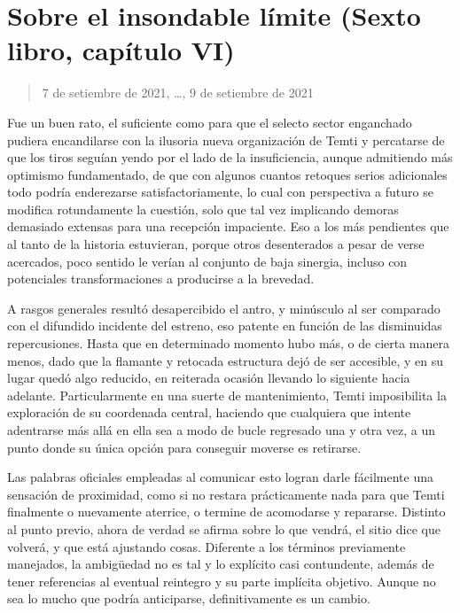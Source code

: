 \documentclass[
]{book}
\begin{document}
\hypertarget{sobre-el-insondable-luxedmite-sexto-libro-capuxedtulo-vi}{%
\section{Sobre el insondable límite (Sexto libro, capítulo VI)}\label{sobre-el-insondable-luxedmite-sexto-libro-capuxedtulo-vi}}

\begin{quote}
7 de setiembre de 2021, \ldots, 9 de setiembre de 2021
\end{quote}

Fue un buen rato, el suficiente como para que el selecto sector enganchado pudiera encandilarse con la ilusoria nueva organización de Temti y percatarse de que los tiros seguían yendo por el lado de la insuficiencia, aunque admitiendo más optimismo fundamentado, de que con algunos cuantos retoques serios adicionales todo podría enderezarse satisfactoriamente, lo cual con perspectiva a futuro se modifica rotundamente la cuestión, solo que tal vez implicando demoras demasiado extensas para una recepción impaciente. Eso a los más pendientes que al tanto de la historia estuvieran, porque otros desenterados a pesar de verse acercados, poco sentido le verían al conjunto de baja sinergia, incluso con potenciales transformaciones a producirse a la brevedad.

A rasgos generales resultó desapercibido el antro, y minúsculo al ser comparado con el difundido incidente del estreno, eso patente en función de las disminuidas repercusiones. Hasta que en determinado momento hubo más, o de cierta manera menos, dado que la flamante y retocada estructura dejó de ser accesible, y en su lugar quedó algo reducido, en reiterada ocasión llevando lo siguiente hacia adelante. Particularmente en una suerte de mantenimiento, Temti imposibilita la exploración de su coordenada central, haciendo que cualquiera que intente adentrarse más allá en ella sea a modo de bucle regresado una y otra vez, a un punto donde su única opción para conseguir moverse es retirarse.

Las palabras oficiales empleadas al comunicar esto logran darle fácilmente una sensación de proximidad, como si no restara prácticamente nada para que Temti finalmente o nuevamente aterrice, o termine de acomodarse y repararse. Distinto al punto previo, ahora de verdad se afirma sobre lo que vendrá, el sitio dice que volverá, y que está ajustando cosas. Diferente a los términos previamente manejados, la ambigüedad no es tal y lo explícito casi contundente, además de tener referencias al eventual reintegro y su parte implícita objetivo. Aunque no sea lo mucho que podría anticiparse, definitivamente es un cambio.
\end{document}
